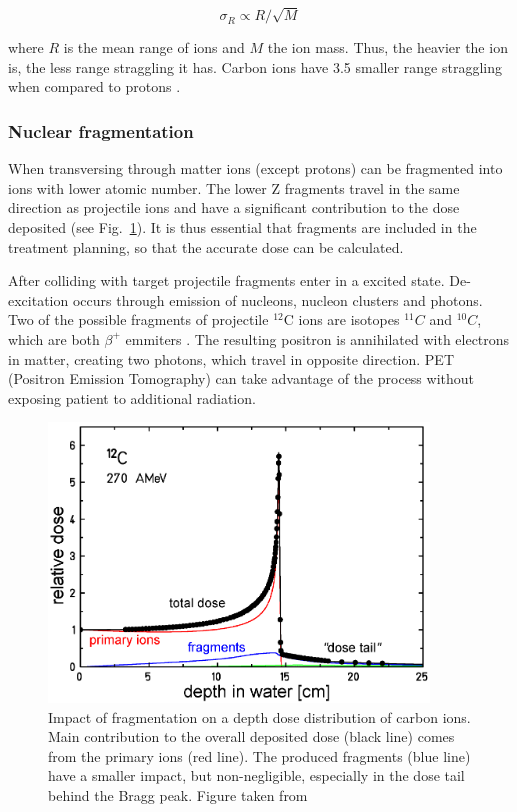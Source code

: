 \documentclass[type=dr, dr=rernat, accentcolor=tud7b,colorbacktitle, bigchapter, openright, twoside, 12pt ]{tudthesis}
\begin{document}
\begin{equation}
 \sigma_R \propto R/\sqrt{M}
\end{equation}

where $R$ is the mean range of ions and $M$ the ion mass. Thus, the heavier the ion is, the less range straggling it has. Carbon ions have 3.5 smaller range straggling when compared to protons \cite{Schardt2010}.

\subsubsection{Nuclear fragmentation}
\label{nuclfrag}

When transversing through matter ions (except protons) can be fragmented into ions with lower atomic number. The lower Z fragments travel in the same direction as projectile ions and 
have a significant contribution to the dose deposited (see Fig.~\ref{iondd}). It is thus essential that fragments are included in the treatment planning, so that the accurate dose can be calculated.

After colliding with target projectile fragments enter in a excited state. De-excitation occurs through
emission of nucleons, nucleon clusters and photons. Two of the possible fragments of projectile $^{12}$C ions are isotopes $^{11}C$ and $^{10}C$, which are both $\beta^+$ emmiters \cite{Kraft2000}.
The resulting positron is annihilated with electrons in matter, creating two photons, which travel in opposite direction. PET (Positron Emission Tomography) can take advantage of the process without exposing patient to additional radiation.

\begin{figure}[H]
\begin{center}
\includegraphics[width=0.9\textwidth]{./Images/iondepthdosesum.png}
\caption{Impact of fragmentation on a depth dose distribution of carbon ions. Main contribution to the overall deposited dose (black line) comes from the primary ions (red line). The produced fragments 
(blue line) have a smaller impact, but non-negligible, especially in the dose tail behind the Bragg peak. Figure taken from \cite{Groezinger2004}}
\label{iondd}
\end{center}
\end{figure}
\end{document}
